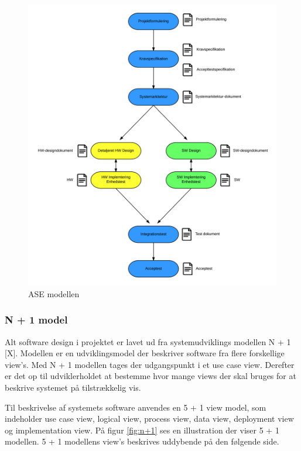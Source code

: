 \begin{figure}[H]
	\centering
	\includegraphics[width=1\textwidth]{Billeder/Udviklingsproces/ase_model}
	\caption{ASE modellen}
	\label{fig:dokument_udvikling}
\end{figure}

\newpage

\subsubsection*{N + 1 model}
Alt software design i projektet er lavet ud fra systemudviklings modellen N + 1 [X]. Modellen er en udviklingsmodel der beskriver software fra flere forskellige view's.  
Med N + 1 modellen tages der udgangspunkt i et use case view. Derefter er det op til udviklerholdet at bestemme hvor mange views der skal bruges for at beskrive systemet på tilstrækkelig vis. 

Til beskrivelse af systemets software anvendes en 5 + 1 view model, som indeholder use case view, logical view, process view, data view, deployment view og implementation view. 
På figur \ref{fig:n+1} ses en illustration der viser 5 + 1 modellen.
5 + 1 modellens view's beskrives uddybende på den følgende side. 

